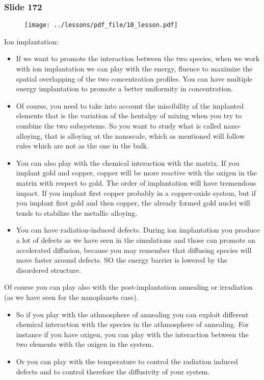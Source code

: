 \documentclass[../main/main.tex]{subfiles}
\begin{document}
\newpage

\subsubsection{Slide 172}

\begin{figure}[h!]
\centering
\texttt{[image: ../lessons/pdf\_file/10\_lesson.pdf]}
\end{figure}

Ion implantation:
\begin{itemize}
\item If we want to promote the interaction between the two species, when we work with ion implantation we can play with the energy, fluence to maximize the spatial overlapping of the two concentration profiles.
You can have multiple energy implantation to promote a better uniformity in concentration.

\item Of course, you need to take into account the miscibility of the implanted elements that is the variation of the hentalpy of mixing when you try to combine the two subsystems. So you want to study what is called nano-alloying, that is alloying at the nanoscale, which as mentioned will follow rules which are not as the one in the bulk.

\item You can also play with the chemical interaction with the matrix. If you implant gold and copper, copper will be more reactive with the oxigen in the matrix with respect to gold. The order of implantation will have tremendous impact. If you implant first copper probably in a copper-oxide system, but if you implant first gold and then copper, the already formed gold nuclei will tends to stabilize the metallic alloying.

\item You can have radiation-induced defects. During ion implantation you produce a lot of defects as we have seen in the simulations and those can promote an accelerated diffusion, because you may remember that diffusing species will move faster around defects. SO the energy barrier is lowered by the disordered structure.
\end{itemize}

Of course you can play also with the post-implantation annealing or irradiation (as we have seen for the nanoplanets case).

\begin{itemize}
\item So if you play with the athmosphere of annealing you can exploit different chemical interaction with the species in the athmosphere of annealing. For instance if you have oxigen, you can play with the interaction between the two elements with the oxigen in the system.

\item Or you can play with the temperature to control the radiation induced defects and to control therefore the diffusivity of your system.

\end{itemize}
\end{document}
